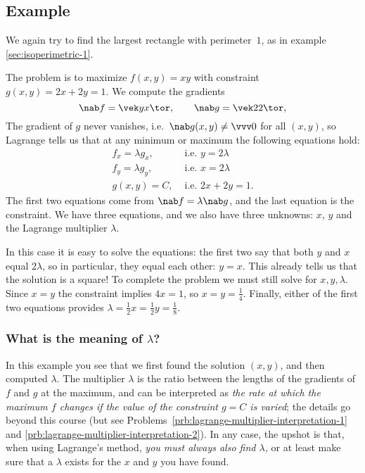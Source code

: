 \subsection{Example}
We again try to find the largest rectangle with
perimeter~$1$, as in example \ref{sec:isoperimetric-1}.

The problem is to maximize $f(x, y) = xy$ with constraint $g(x, y) = 2x+2y = 1$.  We
compute the gradients
\[
\nab f = \vek y \\ x\tor, \qquad \nab g = \vek2\\2\tor,
\]
The gradient of $g$ never vanishes, i.e.\ $\nab g(x,y)\neq\vvv0$ for all $(x, y)$, so
Lagrange tells us that at any minimum or maximum the following equations hold:
\begin{align*}
  f_x = \lambda g_x, &\text{ i.e. } y=2\lambda \\
  f_y = \lambda g_y, &\text{ i.e. } x=2\lambda \\
  g(x, y)=C, &\text{ i.e. } 2x+2y=1.
\end{align*}
The first two equations come from $\nab f = \lambda \nab g$, and the last equation is
the constraint.  We have three equations, and we also have three unknowns: $x$, $y$
and the Lagrange multiplier $\lambda$.

In this case it is easy to solve the equations: the first two say that both $y$ and
$x$ equal $2\lambda$, so in particular, they equal each other: $y=x$.  This already
tells us that the solution is a square!  To complete the problem we must still solve
for $x, y, \lambda$. Since $x=y$ the constraint implies $4x=1$, so $x=y=\frac14$.
Finally, either of the first two equations provides $\lambda = \frac12x =\frac12y =
\frac18$.

\subsubsection*{What is the meaning of $\lambda$?}
In this example you
see that we first found the solution $(x, y)$, and then computed
$\lambda$.  The multiplier $\lambda$ is the ratio between the lengths of
the gradients of $f$ and $g$ at the maximum, and can be interpreted as
\textit{the rate at which the maximum $f$ changes if the value of the
constraint $g=C$ is varied};  the details go beyond this course (but see
Problems~\ref{prb:lagrange-multiplier-interpretation-1} and
\ref{prb:lagrange-multiplier-interpretation-2}).  In any case, the
upshot is that, when using Lagrange's method, \textit{you must always
also find $\lambda$,} or at least make sure that a $\lambda$ exists for
the $x$ and $y$ you have found.


